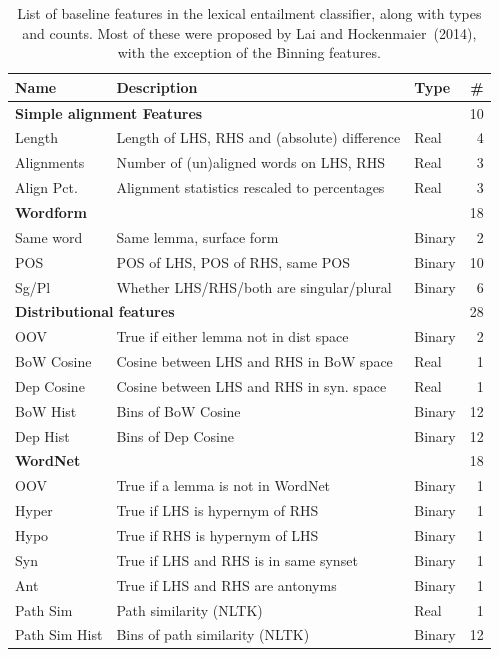 \begin{table}
\centering
\begin{small}
\begin{tabular}{|lllr|}
    \hline
    \bf{Name} & \bf{Description} & \bf{Type} & \bf{\#}\\
    \hline\hline
    \multicolumn{3}{|l}{\bf{Simple alignment Features}} & 10 \\
    \hline
    Length & Length of LHS, RHS and (absolute) difference & Real & 4\\
    Alignments & Number of (un)aligned words on LHS, RHS & Real & 3\\
    Align Pct. & Alignment statistics rescaled to percentages & Real & 3\\
    \hline\hline
    \multicolumn{3}{|l}{\bf{Wordform}} & 18\\
    \hline
    Same word & Same lemma, surface form & Binary & 2\\
    POS & POS of LHS, POS of RHS, same POS & Binary & 10\\
    Sg/Pl & Whether LHS/RHS/both are singular/plural & Binary & 6\\
    \hline
    \hline
    \multicolumn{3}{|l}{\bf Distributional features} & 28\\
    \hline
    OOV & True if either lemma not in dist space & Binary & 2\\
    BoW Cosine & Cosine between LHS and RHS in BoW space & Real & 1\\
    Dep Cosine & Cosine between LHS and RHS in syn. space & Real & 1\\
    BoW Hist & Bins of BoW Cosine & Binary & 12\\
    Dep Hist & Bins of Dep Cosine & Binary & 12\\
    \hline
    \hline
    \multicolumn{3}{|l}{\bf WordNet} & 18\\
    \hline
    OOV & True if a lemma is not in WordNet & Binary & 1\\
    Hyper & True if LHS is hypernym of RHS & Binary & 1\\
    Hypo & True if RHS is hypernym of LHS & Binary & 1\\
    Syn & True if LHS and RHS is in same synset & Binary & 1\\
    Ant & True if LHS and RHS are antonyms & Binary & 1\\
    Path Sim & Path similarity (NLTK) & Real & 1\\
    Path Sim Hist & Bins of path similarity (NLTK) & Binary & 12\\
    \hline
\end{tabular}
\caption{List of baseline features in the lexical entailment classifier, along
with types and counts. Most of these were proposed by Lai and Hockenmaier~(2014),
with the exception of the Binning features.}
\label{tab:lexentfeat}
\end{small}
\end{table}

